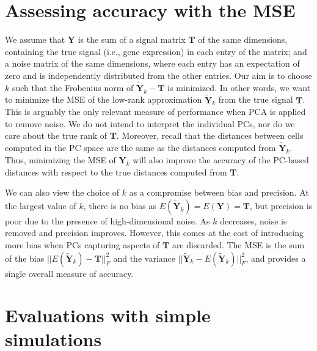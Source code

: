 \documentclass[10pt,letterpaper]{article}
\begin{document}
\section{Assessing accuracy with the MSE}
We assume that $\mathbf{Y}$ is the sum of a signal matrix $\mathbf{T}$ of the same dimensions, 
containing the true signal (i.e., gene expression) in each entry of the matrix;
and a noise matrix of the same dimensions, where each entry has an expectation of zero and is independently distributed from the other entries.
Our aim is to choose $k$ such that the Frobenius norm of $\mathbf{\tilde Y}_{k} - \mathbf{T}$ is minimized.
In other words, we want to minimize the MSE of the low-rank approximation $\mathbf{\tilde Y}_{k}$ from the true signal $\mathbf{T}$.
This is arguably the only relevant measure of performance when PCA is applied to remove noise.
We do not intend to interpret the individual PCs, nor do we care about the true rank of $\mathbf{T}$.
Moreover, recall that the distances between cells computed in the PC space are the same as the distances computed from $\mathbf{\tilde Y}_{k}$.
Thus, minimizing the MSE of $\mathbf{\tilde Y}_k$ will also improve the accuracy of the PC-based distances with respect to the true distances computed from $\mathbf{T}$.

We can also view the choice of $k$ as a compromise between bias and precision.
At the largest value of $k$, there is no bias as $E(\mathbf{\tilde Y}_{k}) = E(\mathbf{Y}) = \mathbf{T}$, but precision is poor due to the presence of high-dimensional noise.
As $k$ decreases, noise is removed and precision improves.
However, this comes at the cost of introducing more bias when PCs capturing aspects of $\mathbf{T}$ are discarded.
The MSE is the sum of the bias $||E(\mathbf{\tilde Y}_{k}) - \mathbf{T}||^2_F$ and the variance $||\mathbf{\tilde Y}_{k} - E(\mathbf{\tilde Y}_{k})||^2_F$, and provides a single overall measure of accuracy.

\section{Evaluations with simple simulations}
\end{document}
